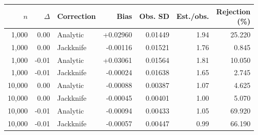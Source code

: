 \begin{tabular}{@{}rrlrrrr@{}}
\toprule
\(n\) & \(\Delta\) & Correction & Bias & Obs. SD & Est./obs. & \shortstack{Rejection\\(\%)}\\
\midrule
1,000 & 0.00 & Analytic & +0.02960 & 0.01449 & 1.94 & 25.220\\
1,000 & 0.00 & Jackknife & -0.00116 & 0.01521 & 1.76 & 0.845\\
\midrule
1,000 & -0.01 & Analytic & +0.03061 & 0.01564 & 1.81 & 10.050\\
1,000 & -0.01 & Jackknife & -0.00024 & 0.01638 & 1.65 & 2.745\\
\midrule
10,000 & 0.00 & Analytic & -0.00088 & 0.00387 & 1.07 & 4.625\\
10,000 & 0.00 & Jackknife & -0.00045 & 0.00401 & 1.00 & 5.070\\
\midrule
10,000 & -0.01 & Analytic & -0.00094 & 0.00433 & 1.05 & 69.920\\
10,000 & -0.01 & Jackknife & -0.00057 & 0.00447 & 0.99 & 66.190\\
\bottomrule
\end{tabular}
